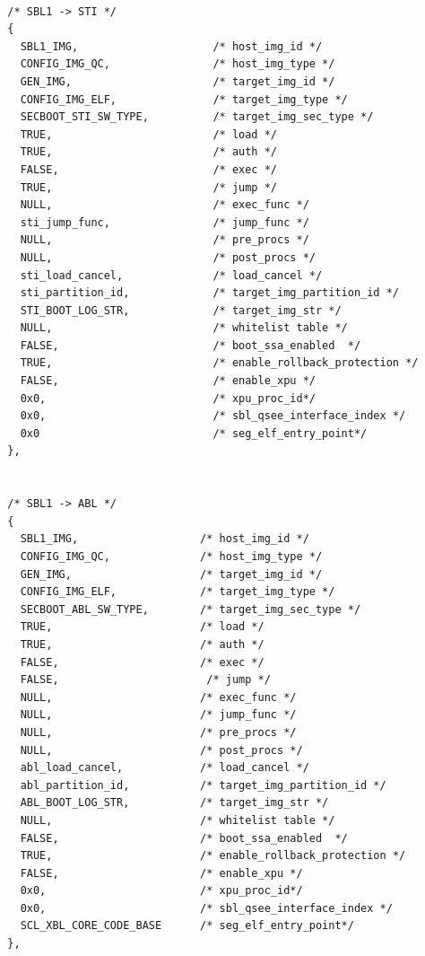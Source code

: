 \begin{lstlisting}
  
  /* SBL1 -> STI */
  {
    SBL1_IMG,                     /* host_img_id */
    CONFIG_IMG_QC,                /* host_img_type */
    GEN_IMG,                      /* target_img_id */
    CONFIG_IMG_ELF,               /* target_img_type */
    SECBOOT_STI_SW_TYPE,          /* target_img_sec_type */ 
    TRUE,                         /* load */
    TRUE,                         /* auth */
    FALSE,                        /* exec */
    TRUE,                         /* jump */
    NULL,                         /* exec_func */
    sti_jump_func,                /* jump_func */
    NULL,                         /* pre_procs */ 
    NULL,                         /* post_procs */
    sti_load_cancel,              /* load_cancel */
    sti_partition_id,             /* target_img_partition_id */
    STI_BOOT_LOG_STR,             /* target_img_str */
    NULL,                         /* whitelist table */
    FALSE,                        /* boot_ssa_enabled  */
    TRUE,                         /* enable_rollback_protection */
    FALSE,                        /* enable_xpu */
    0x0,                          /* xpu_proc_id*/   
    0x0,                          /* sbl_qsee_interface_index */
    0x0                           /* seg_elf_entry_point*/
  },


  /* SBL1 -> ABL */
  {
    SBL1_IMG,                   /* host_img_id */
    CONFIG_IMG_QC,              /* host_img_type */
    GEN_IMG,                    /* target_img_id */
    CONFIG_IMG_ELF,             /* target_img_type */
    SECBOOT_ABL_SW_TYPE,        /* target_img_sec_type */ 
    TRUE,                       /* load */
    TRUE,                       /* auth */
    FALSE,                      /* exec */
    FALSE,                       /* jump */
    NULL,                       /* exec_func */
    NULL,                       /* jump_func */
    NULL,                       /* pre_procs */ 
    NULL,                       /* post_procs */
    abl_load_cancel,            /* load_cancel */
    abl_partition_id,           /* target_img_partition_id */
    ABL_BOOT_LOG_STR,           /* target_img_str */
    NULL,                       /* whitelist table */
    FALSE,                      /* boot_ssa_enabled  */
    TRUE,                       /* enable_rollback_protection */
    FALSE,                      /* enable_xpu */
    0x0,                        /* xpu_proc_id*/   
    0x0,                        /* sbl_qsee_interface_index */
    SCL_XBL_CORE_CODE_BASE      /* seg_elf_entry_point*/
  },  



\end{lstlisting}
